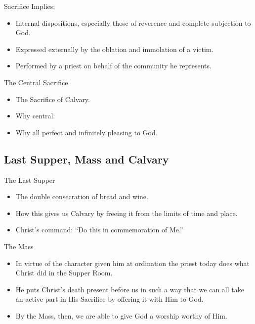 \documentclass{beamer}
\begin{document}
\begin{frame}{Sacrifice Implies:}
\begin{itemize}
\item  Internal dispositions, especially those of reverence and  complete
       subjection to God.
\item  Expressed externally by the oblation and immolation of a victim.
\item Performed by a priest on behalf of the community he represents.
\end{itemize}
\end{frame}

\begin{frame}{The Central Sacrifice.}
\begin{itemize}
\item  The Sacrifice of Calvary.
\item   Why central.
\item   Why all perfect and infinitely pleasing to God.
\end{itemize}
\end{frame}

\subsection{Last Supper, Mass and Calvary}

\begin{frame}{The Last Supper}
\begin{itemize}
\item    The double consecration of bread and wine.
\item    How this gives us Calvary by freeing it from the  limits  of  time
   and place.
\item    Christ's command: ``Do this in commemoration of Me.''
\end{itemize}
\end{frame}

\begin{frame}{The Mass}
\begin{itemize}
\item    In virtue of the character given  him  at  ordination  the  priest
    today does what Christ did in the Supper Room.
\item    He puts Christ's death present before us in such a way that we can
    all take an active part in His Sacrifice by offering  it  with  Him  to
    God.
\item    By the Mass, then, we are able to give God  a  worship  worthy  of
    Him.
\end{itemize}
\end{frame}
\end{document}
